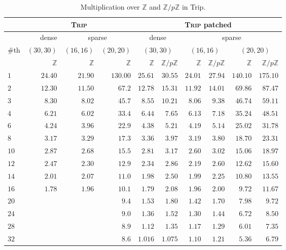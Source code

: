 \documentclass{deliverablereport}
\begin{document}
\begin{table}
\begin{tabular}{l | r | r | r | r | r | r | r | r | r |}
 & \multicolumn{3}{|c|}{\textsc{Trip}} & \multicolumn{6}{|c|}{\textsc{Trip} patched} \\ \hline
 & {dense} & \multicolumn{2}{|c|}{sparse} & \multicolumn{2}{|c|}{dense} & \multicolumn{4}{|c|}{sparse} \\ \hline
\#th  & $(30, 30)$ & $(16, 16)$ & $(20, 20)$ & \multicolumn{2}{|c|}{$(30, 30)$} & \multicolumn{2}{|c|}{$(16, 16)$} & \multicolumn{2}{|c|}{$(20, 20)$}\\ \hline
 & $\mathbb{Z}$ & $\mathbb{Z}$ & $\mathbb{Z}$ & $\mathbb{Z}$ & $\mathbb{Z}/p\mathbb{Z}$ & $\mathbb{Z}$ & $\mathbb{Z}/p\mathbb{Z}$ & $\mathbb{Z}$ & $\mathbb{Z}/p\mathbb{Z}$ \\ \hline
$1$   & $24.40$ & $21.90$ & $130.00$ &  $25.61$ & $30.55$ & $24.01$ & $27.94$ & $140.10$ & $175.10$\\ \hline
$2$   & $12.30$ & $11.50$ & $67.2$   &  $12.78$ & $15.31$ & $11.92$ & $14.01$ & $69.86$ & $87.47$\\ \hline
$3$   & $8.30$ & $8.02$  & $45.7$    &  $8.55$ & $10.21$ & $8.06$ & $9.38$ & $46.74$ & $59.11$\\ \hline
$4$   & $6.21$ & $6.02$ & $33.4$     &  $6.44$ & $7.65$ & $6.13$ & $7.18$ & $35.24$ & $48.51$\\ \hline
$6$   & $4.24$ & $3.96$ & $22.9$     &  $4.38$ & $5.21$ & $4.19$ & $5.14$ & $25.02$ & $31.78$\\ \hline
$8$   & $3.17$ & $3.29$ & $17.3$     &  $3.36$ & $3.97$ & $3.19$ & $3.80$ & $18.70$ & $23.31$\\ \hline
$10$  & $2.87$ & $2.68$ & $15.5$     &  $2.81$ & $3.17$ & $2.60$ & $3.02$ & $15.06$ & $18.97$\\ \hline
$12$  & $2.47$ & $2.30$ & $12.9$     &  $2.34$ & $2.86$ & $2.19$ & $2.60$ & $12.62$ & $15.60$\\ \hline
$14$  & $2.01$ & $2.07$  & $11.0$    &  $1.98$ & $2.50$ & $1.99$ & $2.25$ & $10.80$ & $13.55$\\ \hline
$16$  & $1.78$ & $1.96$  & $10.1$    &  $1.79$ & $2.08$ & $1.96$ & $2.00$ & $9.72$ & $11.67$\\ \hline
$20$  &  &   & $9.4$                 &  $1.53$ & $1.80$ & $1.42$ & $1.70$ & $7.98$ & $9.72$\\ \hline
$24$  &  &   & $9.0$                 &  $1.36$ & $1.52$ & $1.30$ & $1.44$ & $6.72$ & $8.50$\\ \hline
$28$  &  &   & $8.9$                 &  $1.12$ & $1.35$ & $1.17$ & $1.29$ & $6.01$ & $7.35$\\ \hline
$32$  &  &   & $8.6$                 &  $1.016$ & $1.075$ & $1.10$ & $1.21$ & $5.36$ & $6.79$\\ \hline
\end{tabular}
\caption{Multiplication over $\mathbb{Z}$ and $\mathbb{Z}/p \mathbb{Z}$ in Trip.}
\label{table_trip}
\end{table}
\end{document}
